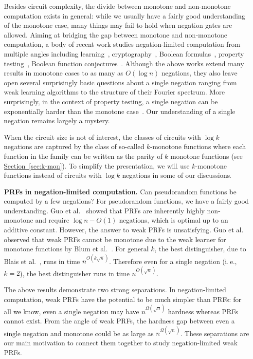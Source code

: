 \documentclass[11pt]{article}
\numberwithin{equation}{section}
\theoremstyle{definition}
\theoremstyle{plain}
\newcommand{\ie}{i.\,e.}
\newcommand{\expref}[2]{\hyperref[#2]{#1~\ref{#2}}}
\begin{document}
Besides circuit complexity, the divide between monotone and non-monotone computation exists in general:  while we usually have a fairly good understanding of the monotone case, many things may fail to hold when negation gates are allowed. Aiming at bridging the gap between monotone and non-monotone computation, a body of recent work studies negation-limited computation from multiple angles including learning~\cite{BCOST15}, cryptography~\cite{GMOR15}, Boolean formulas~\cite{GK15,Ros15}, property testing~\cite{CGGKW17,GKW19}, Boolean function conjectures~\cite{LZ17}. Although the above works extend many results in monotone cases to as many as $O(\log n)$ negations, they also leave open several surprisingly basic questions about a single negation ranging from weak learning algorithms to the structure of their Fourier spectrum. More surprisingly, in the context of property testing, a single negation can be exponentially harder than the monotone case~\cite{CGGKW17,GKW19}.  Our understanding of a single negation remains largely a mystery.

When the circuit size is not of interest, the classes of circuits with $\log k$ negations are captured by the class of so-called $k$-monotone functions where each function in the family can be written as the parity of $k$ monotone
%
functions (see  %
\expref{Section}{sec:k-mon}). To simplify the presentation, we will use $k$-monotone functions instead of circuits with $\log{k}$ negations in some of our discussions.

\vspace{2ex}
%
\noindent\textbf{PRFs in negation-limited computation.} %
Can pseudorandom functions be computed by a few negations? For pseudorandom functions, we have a fairly good understanding. Guo et al.~\cite{GMOR15} showed that PRFs are inherently highly non-monotone and require $\log{n}-O(1)$ negations, which is optimal up to an additive constant. However, the answer to weak PRFs is unsatisfying. Guo et al.~\cite{GMOR15} observed that weak PRFs cannot be monotone due to the weak learner for monotone functions by Blum et al.~\cite{BABL98}. For general $k$, the best distinguisher, due to Blais et al.~\cite{BCOST15}, runs in time $n^{O(k\sqrt{n})}$.  Therefore even for a single negation (\ie, $k=2$), the best distinguisher runs in time $n^{O(\sqrt{n})}$.

The above results demonstrate two strong separations. In negation-limited computation,
weak PRFs have the potential to be much simpler than PRFs: 
for all we know, %
even a single negation
may have %
%
%
%
%
$n^{\Omega(\sqrt{n})}$ %
hardness whereas PRFs cannot exist. From the angle of weak PRFs, the hardness gap between even a single negation and monotone 
%
could %
be %
as large as 
%
$n^{\Omega(\sqrt{n})}$.  %
%
These separations are our main motivation to connect them together to study negation-limited weak PRFs. 
\end{document}
